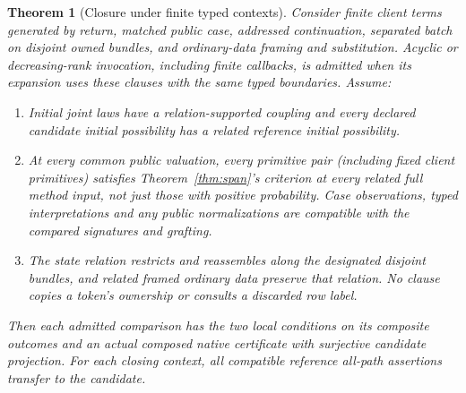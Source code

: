 \documentclass[11pt]{article}
\newtheorem{theorem}{Theorem}
\theoremstyle{definition}
\begin{document}
\begin{theorem}[Closure under finite typed contexts]\label{thm:closure}
Consider finite client terms generated by return, matched public case,
addressed continuation, separated batch on disjoint owned bundles, and
ordinary-data framing and substitution. Acyclic or decreasing-rank
invocation, including finite callbacks, is admitted when its expansion
uses these clauses with the same typed boundaries. Assume:
\begin{enumerate}
\item Initial joint laws have a relation-supported coupling and every declared
candidate initial possibility has a related reference initial possibility.
\item At every common public valuation, every primitive pair (including fixed client primitives) satisfies Theorem~\ref{thm:span}'s criterion
at \emph{every} related full method input, not just those with positive
probability. Case observations, typed interpretations and any public
normalizations are compatible with the compared signatures and grafting.
\item The state relation restricts and reassembles along the designated
disjoint bundles, and related framed ordinary data preserve that relation.
No clause copies a token's ownership or consults a discarded row label.
\end{enumerate}
Then each admitted comparison has the two local conditions on its
composite outcomes and an actual composed native certificate with
surjective candidate projection. For each closing context, all compatible
reference all-path assertions transfer to the candidate.
\end{theorem}
\end{document}
